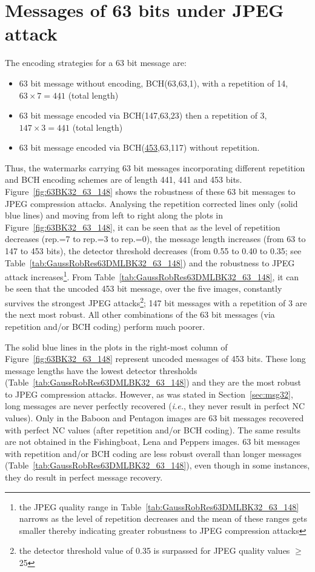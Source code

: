 \documentclass[12pt]{report}
\begin{document}
\section{Messages of 63 bits under JPEG attack} 
\label{sec:msg63}
The encoding strategies for a 63 bit message are:
\begin{itemize}
        \item 63 bit message without encoding, BCH(63,63,1), with a repetition of 14, $63 \times 7 = \underline{441}$ (total length)
        \item 63 bit message encoded via BCH(147,63,23) then a repetition of 3, $147 \times 3 = \underline{441}$ (total length)
        \item 63 bit message encoded via BCH(\underline{453},63,117) without repetition.
\end{itemize}
Thus, the watermarks carrying 63 bit messages incorporating different repetition and BCH encoding schemes are of length
441, 441 and 453 bits.
Figure~\ref{fig:63BK32_63_148} shows the robustness of these 63 bit messages to JPEG compression attacks. 
Analysing the repetition corrected lines only (solid blue lines) and moving from left to right along the plots
in Figure~\ref{fig:63BK32_63_148}, it can be seen that as the level of repetition decreases (rep.=7 to 
rep.=3 to rep.=0), the message length increases (from 63 to 147 to 453 bits),
the detector threshold decreases (from 0.55 to 0.40 to 0.35; see Table~\ref{tab:GaussRobRes63DMLBK32_63_148}) and
the robustness to JPEG attack increases\footnote{the JPEG quality range in Table~\ref{tab:GaussRobRes63DMLBK32_63_148}
narrows as the level of repetition decreases and the mean of these ranges gets smaller thereby indicating greater robustness
to JPEG compression attacks}.
From Table~\ref{tab:GaussRobRes63DMLBK32_63_148}, it can be seen that the 
uncoded 453 bit message, 
over the five images, constantly survives the strongest JPEG 
attacks\footnote{the detector threshold value of 0.35 is surpassed for JPEG quality values $\geq$ 25};
147 bit messages with a repetition of 3 are the next most robust. All other combinations of the 63 bit messages (via
repetition and/or BCH coding) perform much poorer.

The solid blue lines in the plots in the right-most column of Figure~\ref{fig:63BK32_63_148} represent uncoded
messages of 453 bits. These long message lengths have the lowest detector thresholds
(Table~\ref{tab:GaussRobRes63DMLBK32_63_148}) and they are the most robust to JPEG compression attacks.
However, as was stated in Section~\ref{sec:msg32}, long messages are never perfectly recovered
(\emph{i.e.}, they never result in perfect NC values). 
Only in the Baboon and Pentagon images are 63 bit messages recovered with perfect NC values (after repetition and/or BCH coding).
The same results are not obtained in the Fishingboat, Lena and Peppers images. 63 bit messages with repetition and/or BCH coding
are less robust overall than longer messages (Table~\ref{tab:GaussRobRes63DMLBK32_63_148}), even though in some instances, 
they do result in perfect message recovery.
\end{document}
